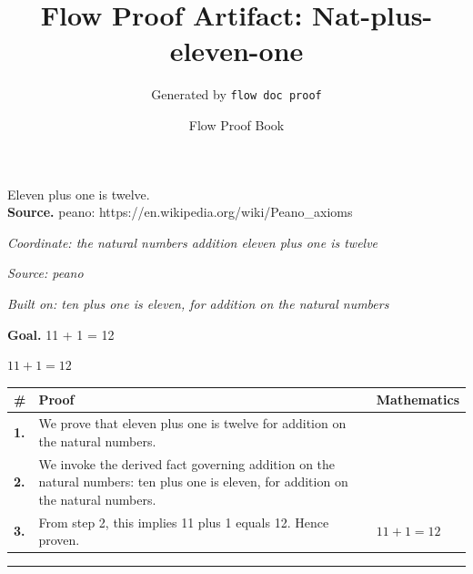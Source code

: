\documentclass[11pt]{article}
\title{Flow Proof Artifact: Nat-plus-eleven-one}
\author{Generated by \texttt{flow doc proof}}
\date{Flow Proof Book}
\theoremstyle{definition}
\begin{document}
\maketitle
Eleven plus one is twelve.\\[0.5em]
\textbf{Source.} peano: https://en.wikipedia.org/wiki/Peano\_axioms\\[0.5em]
\bigskip
{}\par
\smallskip\noindent\textit{Coordinate: the natural numbers \cdot addition \cdot eleven plus one is twelve}\par
\smallskip\noindent\textit{Source: peano}\par
\smallskip\noindent\textit{Built on: ten plus one is eleven, for addition on the natural numbers}\par
\medskip
\noindent\textbf{Goal.} 11 + 1 = 12\par
\noindent$\displaystyle 11 + 1 = 12$\par
\medskip
\noindent
\begin{tabular}{@{} >{\raggedright\arraybackslash}p{} >{\raggedright\arraybackslash}p{} >{\raggedleft\arraybackslash}p{} @{}}
\textbf{\#} & \textbf{Proof} & \textbf{Mathematics} \\
\midrule
\textbf{1.} & We prove that eleven plus one is twelve for addition on the natural numbers. & \\[0.45em]
\textbf{2.} & We invoke the derived fact governing addition on the natural numbers: ten plus one is eleven, for addition on the natural numbers. & \\[0.45em]
\textbf{3.} & From step 2, this implies 11 plus 1 equals 12. Hence proven. & $\displaystyle 11 + 1 = 12$ \\[0.45em]
\bottomrule
\end{tabular}
\label{thm:Nat-addition-eleven_plus_one_is_twelve}
\par\medskip\hrule
\end{document}
